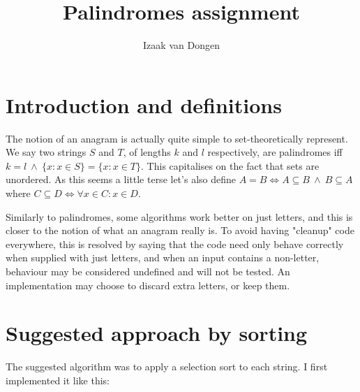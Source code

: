 \documentclass{article}
\title{Palindromes assignment}
\author{Izaak van Dongen}
\begin{document}
    \maketitle
    \tableofcontents

    \section{Introduction and definitions}

    The notion of an anagram is actually quite simple to set-theoretically
    represent. We say two strings $S$ and $T$, of lengths $k$ and $l$
    respectively, are palindromes iff
    $k = l\ \land\ \{x: x \in S\} = \{x: x \in T\}$.
    This capitalises on the fact that sets are unordered. As this seems a
    little terse let's also define
    $A = B \iff A \subseteq B\ \land\ B \subseteq A$
    where
    $C \subseteq D \iff \forall x \in C: x \in D$.

    Similarly to palindromes, some algorithms work better on just letters, and
    this is closer to the notion of what an anagram really is. To avoid having
    "cleanup" code everywhere, this is resolved by saying that the code need
    only behave correctly when supplied with just letters, and when an input
    contains a non-letter, behaviour may be considered undefined and will not
    be tested. An implementation may choose to discard extra letters, or keep
    them.

    \section{Suggested approach by sorting}

    The suggested algorithm was to apply a selection sort to each string. I
    first implemented it like this:
\end{document}
